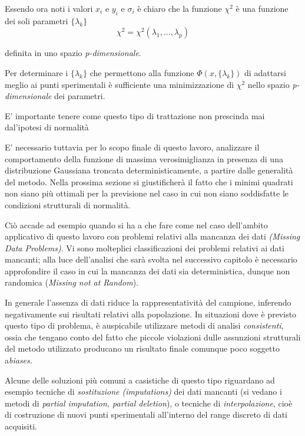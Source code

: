 \documentclass[12pt,openright,twoside,a4paper]{book}
\begin{document}
Essendo ora noti i valori $x_i$ e $y_i$ e $\sigma_i$ è chiaro che la funzione $\chi^2$ è una funzione dei soli parametri $\{\lambda_k\}$
\begin{equation}
\chi^2=\chi^2(\lambda_1,...,\lambda_p)
\end{equation}

definita in uno spazio \textit{p-dimensionale}.

Per determinare i $\{\lambda_k\}$ che permettono alla funzione $\Phi(x,\{\lambda_k\})$ di adattarsi meglio ai punti sperimentali è sufficiente una minimizzazione di $\chi^2$ nello spazio \textit{p-dimensionale} dei parametri. \cite{fornasini}

E' importante tenere come questo tipo di trattazione non prescinda mai dal'ipotesi di normalità

E' necessario tuttavia per lo scopo finale di questo lavoro, analizzare il comportamento della funzione di massima verosimiglianza in presenza di una distribuzione Gaussiana troncata deterministicamente, a partire dalle generalità del metodo.
Nella prossima sezione si giustificherà il fatto che i minimi quadrati non siano più ottimali per la previsione nel caso in cui non siano soddisfatte le condizioni strutturali di normalità.

Ciò accade ad esempio quando si ha a che fare come nel caso dell'ambito applicativo di questo lavoro con problemi relativi alla mancanza dei dati \textit{(Missing Data Problems)}.
Vi sono molteplici classificazioni dei problemi relativi ai dati mancanti; alla luce dell'analisi che sarà svolta nel successivo capitolo è necessario approfondire il caso in cui la mancanza dei dati sia deterministica, dunque non randomica (\textit{Missing not at Random}).

In generale l'assenza di dati riduce la rappresentatività del campione, inferendo negativamente sui risultati relativi alla popolazione.
In situazioni dove è previsto questo tipo di problema, è auspicabile utilizzare metodi di analisi \textit{consistenti}, ossia che tengano conto del fatto che piccole violazioni dulle assunzioni strutturali del metodo utilizzato producano un risultato finale comunque poco soggetto a\textit{biases}.

Alcune delle soluzioni più comuni a casistiche di questo tipo riguardano ad esempio tecniche di \textit{sostituzione (imputations)} dei dati mancanti (si vedano i metodi di \textit{partial imputation, partial deletion}), o tecniche di \textit{interpolazione}, cioè di costruzione di nuovi punti sperimentali all'interno del range discreto di dati acquisiti. \cite{Mdata}
\end{document}
